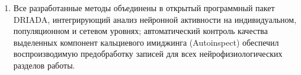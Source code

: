 \begin{enumerate}
  \item Все разработанные методы объединены в открытый программный пакет DRIADA, интегрирующий анализ нейронной активности на индивидуальном, популяционном и сетевом уровнях; автоматический контроль качества выделенных компонент кальциевого имиджинга (Autoinspect) обеспечил воспроизводимую предобработку записей для всех нейрофизиологических разделов работы.
\end{enumerate}
